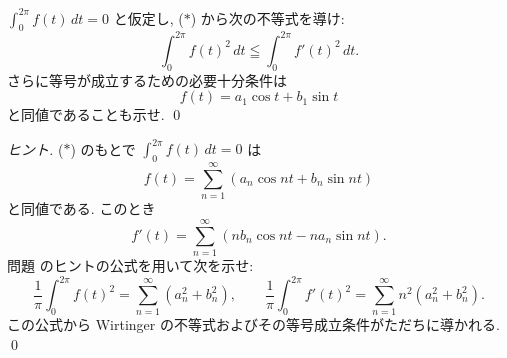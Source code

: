 \documentclass[12pt,twoside]{jarticle}
\begin{document}
\begin{question}
 $\int_0^{2\pi}f(t)\,dt = 0$ と仮定し, ($*$) から次の不等式を導け:
 \begin{equation*}
  \int_0^{2\pi} f(t)^2 \,dt \leqq \int_0^{2\pi} f'(t)^2\, dt.
 \end{equation*}
 さらに等号が成立するための必要十分条件は
 \begin{equation*}
  f(t) = a_1 \cos t + b_1 \sin t
 \end{equation*}
 と同値であることも示せ. \qed
\end{question}

\begin{proof}[ヒント]
 ($*$) のもとで $\int_0^{2\pi}f(t)\,dt = 0$ は
 \begin{equation*}
  f(t) = \sum_{n=1}^\infty(a_n\cos nt + b_n\sin nt)
 \end{equation*}
 と同値である. このとき
 \begin{equation*}
  f'(t) = \sum_{n=1}^\infty(n b_n\cos nt - n a_n \sin nt).
 \end{equation*}
 問題  のヒントの公式を用いて次を示せ:
 \begin{equation*}
  \frac{1}{\pi}\int_0^{2\pi} f(t)^2 = \sum_{n=1}^\infty(a_n^2+b_n^2),
  \qquad
  \frac{1}{\pi}\int_0^{2\pi} f'(t)^2 = \sum_{n=1}^\infty n^2(a_n^2+b_n^2).
 \end{equation*}
 この公式から Wirtinger の不等式およびその等号成立条件がただちに導かれる.
 \qed
\end{proof}








\end{document}
